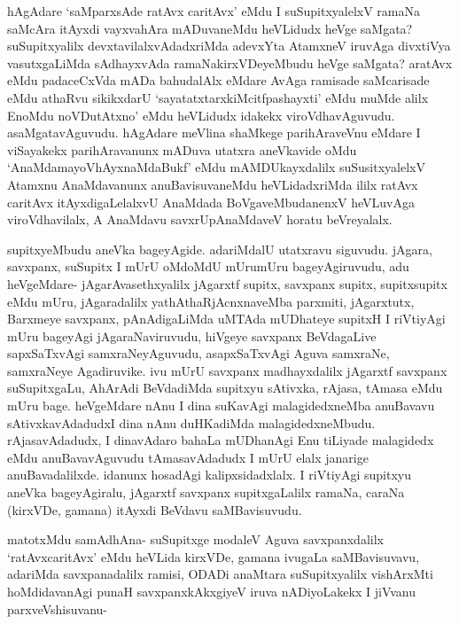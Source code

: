\begin{artha}
hAgAdare `saMparxsAde ratAvx caritAvx' eMdu I suSupitxyalelxV ramaNa saMcAra itAyxdi vayxvahAra mADuvaneMdu heVLidudx heVge saMgata? suSupitxyalilx devxtavilalxvAdadxriMda adevxYta AtamxneV iruvAga divxtiVya vasutxgaLiMda sAdhayxvAda ramaNakirxVDeyeMbudu heVge saMgata? aratAvx eMdu padaceCxVda mADa bahudalAlx eMdare AvAga ramisade saMcarisade eMdu athaRvu sikikxdarU `sayatatxtarxkiMcitfpashayxti' eMdu muMde alilx EnoMdu noVDutAtxno' eMdu heVLidudx idakekx viroVdhavAguvudu. asaMgatavAguvudu. hAgAdare meVlina shaMkege parihAraveVnu eMdare I viSayakekx parihAravanunx mADuva utatxra aneVkavide oMdu `AnaMdamayoVhAyxnaMdaBukf' eMdu mAMDUkayxdalilx suSusitxyalelxV Atamxnu AnaMdavanunx anuBavisuvaneMdu heVLidadxriMda ililx ratAvx caritAvx itAyxdigaLelalxvU AnaMdada BoVgaveMbudanenxV heVLuvAga viroVdhavilalx, A AnaMdavu savxrUpAnaMdaveV horatu beVreyalalx. 
\end{artha}%


\begin{artha}
supitxyeMbudu aneVka bageyAgide. adariMdalU utatxravu siguvudu. jAgara, savxpanx, suSupitx I mUrU oMdoMdU mUrumUru bageyAgiruvudu, adu heVgeMdare- jAgarAvasethxyalilx jAgarxtf supitx, savxpanx supitx, supitxsupitx eMdu mUru, jAgaradalilx yathAthaRjAcnxnaveMba parxmiti, jAgarxtutx, Barxmeye savxpanx, pAnAdigaLiMda uMTAda mUDhateye supitxH I riVtiyAgi mUru bageyAgi jAgaraNaviruvudu, hiVgeye savxpanx BeVdagaLive sapxSaTxvAgi samxraNeyAguvudu, asapxSaTxvAgi Aguva samxraNe, samxraNeye Agadiruvike. ivu mUrU savxpanx madhayxdalilx jAgarxtf savxpanx suSupitxgaLu, AhArAdi BeVdadiMda supitxyu sAtivxka, rAjasa, tAmasa eMdu mUru bage. heVgeMdare nAnu I dina suKavAgi malagidedxneMba anuBavavu sAtivxkavAdadudxI dina nAnu duHKadiMda malagidedxneMbudu. rAjasavAdadudx, I dinavAdaro bahaLa mUDhanAgi Enu tiLiyade malagidedx eMdu anuBavavAguvudu tAmasavAdadudx I mUrU elalx janarige anuBavadalilxde. idanunx hosadAgi kalipxsidadxlalx. I riVtiyAgi supitxyu aneVka bageyAgiralu, jAgarxtf savxpanx supitxgaLalilx ramaNa, caraNa (kirxVDe, gamana) itAyxdi BeVdavu saMBavisuvudu.
\end{artha}

\begin{artha}
matotxMdu samAdhAna- suSupitxge modaleV Aguva savxpanxdalilx `ratAvxcaritAvx' eMdu heVLida kirxVDe, gamana ivugaLa saMBavisuvavu, adariMda savxpanadalilx ramisi, ODADi anaMtara suSupitxyalilx vishArxMti hoMdidavanAgi punaH savxpanxkAkxgiyeV iruva nADiyoLakekx I jiVvanu parxveVshisuvanu-
\end{artha}%

